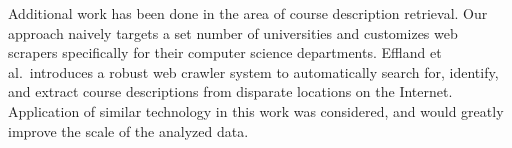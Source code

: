 
Additional work has been done in the area of course description retrieval.
Our approach naively targets a set number of universities and customizes web scrapers specifically for their computer science departments.
Effland et al.\ introduces a robust web crawler system to automatically search for, identify, and extract course descriptions from disparate locations on the Internet.~\cite{Effland2015}
Application of similar technology in this work was considered, and would greatly improve the scale of the analyzed data.



